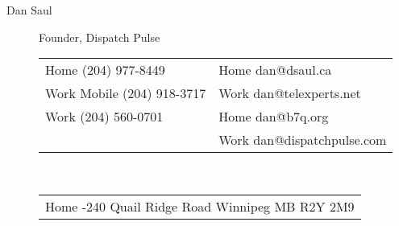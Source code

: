 \documentclass{article}
\newcommand\mydotfill{\cftdotfill{\cftdotsep}}
\begin{document}
\begin{description}
		\normalsize	\blindtext
		\filbreak
		\item [Dan Saul] \small Founder, Dispatch Pulse \\ 
		
		\begin{tabular}{ l || l }
			Home \enspace\mydotfill\enspace (204) 977-8449 & Home \enspace\mydotfill\enspace dan@dsaul.ca \\ 
			Work Mobile \enspace\mydotfill\enspace (204) 918-3717 & Work \enspace\mydotfill\enspace dan@telexperts.net \\  
			Work \enspace\mydotfill\enspace (204) 560-0701 & Home \enspace\mydotfill\enspace dan@b7q.org \\
			\enspace\mydotfill\enspace  & Work \enspace\mydotfill\enspace dan@dispatchpulse.com \\\hline 
		\end{tabular}\\
		\begin{tabular}{ l }
			Home \enspace\mydotfill\enspace 312-240 Quail Ridge Road Winnipeg MB R2Y 2M9 \\
		\end{tabular} \vspace{2ex}
		
		\normalsize	\blindtext
	\end{description}
\end{document}
